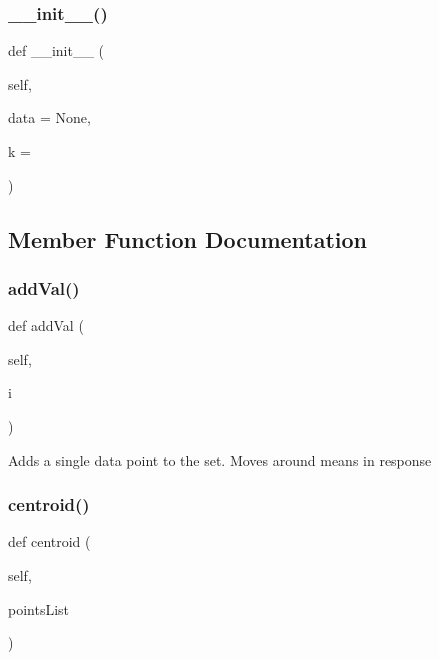 \subsubsection{\texorpdfstring{\_\_init\_\_()}{\_\_init\_\_()}}
{\footnotesize\ttfamily def \+\_\+\+\_\+init\+\_\+\+\_\+ (\begin{DoxyParamCaption}\item[{}]{self,  }\item[{}]{data = {\ttfamily None},  }\item[{}]{k = {} }\end{DoxyParamCaption})}



\subsection{Member Function Documentation}
\mbox{\label{classdynamicfilterapp_1_1simulation__files_1_1cluster_1_1_clusterk_d_a85c7bd6ea30a50cfac9e05aee87964ac}} 
\subsubsection{\texorpdfstring{addVal()}{addVal()}}
{\footnotesize\ttfamily def add\+Val (\begin{DoxyParamCaption}\item[{}]{self,  }\item[{}]{i }\end{DoxyParamCaption})}

\begin{DoxyVerb}Adds a single data point to the set. Moves around means in response
\end{DoxyVerb}
 \mbox{\label{classdynamicfilterapp_1_1simulation__files_1_1cluster_1_1_clusterk_d_aac77177976d5d302c5b583d66aec9275}} 
\subsubsection{\texorpdfstring{centroid()}{centroid()}}
{\footnotesize\ttfamily def centroid (\begin{DoxyParamCaption}\item[{}]{self,  }\item[{}]{points\+List }\end{DoxyParamCaption})}



